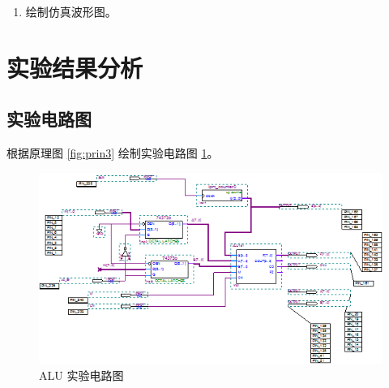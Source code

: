 \begin{enumerate}
\begin{itemize}
        \item Key 7
        
        控制 CN 输入，影响 ALU，切换(带/无)进位运算模式。
        
        \item Key 8
        
        控制 M 输入，影响 ALU，切换(逻辑/算数)运算模式。
        
        \item 数码管 1, 2
        
        第一个源操作数，8 位全有效。
        
        \item 数码管 3, 4
        
        第二个源操作数，8 位全有效。
        
        \item 数码管 5, 6
        
        ALU 计算结果，8 位全有效。
        
        \item 数码管 7
        
        ALU 计算结果的进位标记位，最低位有效。
        
        \item 数码管 8
        
        ALU 功能码，4 位全有效。
        
    \end{itemize}
    \item 绘制仿真波形图。
\end{enumerate}

\section{实验结果分析}

\subsection{实验电路图}

根据原理图 \ref{fig:prin3} 绘制实验电路图 \ref{fig:bdf3}。

\begin{figure}[H]
\centering
\includegraphics[width=\textwidth]{images/bdf3.png}
\caption{ALU 实验电路图}
\label{fig:bdf3}
\end{figure}

